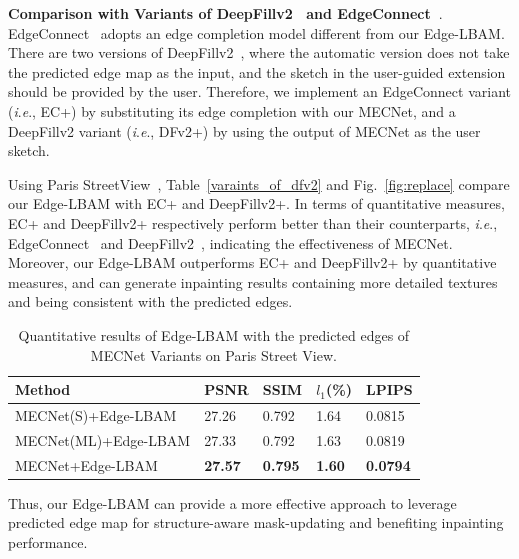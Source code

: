 \documentclass[10pt,journal,compsoc]{IEEEtran}
\newcommand{\ie}{\textit{i}.\textit{e}.}
\begin{document}
{\textbf{Comparison with Variants of DeepFillv2~\cite{yu2018free} and EdgeConnect~\cite{nazeri2019edgeconnect}}.}
%
EdgeConnect~\cite{nazeri2019edgeconnect} adopts an edge completion model different from our Edge-LBAM.
%
There are two versions of DeepFillv2~\cite{yu2018free}, where the automatic version does not take the predicted edge map as the input, and the sketch in the user-guided extension should be provided by the user.
%
Therefore, we implement an EdgeConnect variant (\ie, EC+) by substituting its edge completion with our MECNet, and a DeepFillv2 variant (\ie, DFv2+) by using the output of MECNet as the user sketch.
%
%
%

Using Paris StreetView~\cite{doersch2015makes}, Table~\ref{varaints_of_dfv2} and Fig.~\ref{fig:replace} compare our Edge-LBAM with EC+ and DeepFillv2+.
%
In terms of quantitative measures, EC+ and DeepFillv2+ respectively perform better than their counterparts, \ie, EdgeConnect~\cite{nazeri2019edgeconnect} and DeepFillv2~\cite{yu2018free}, indicating the effectiveness of MECNet.
%
Moreover, our Edge-LBAM outperforms EC+ and DeepFillv2+ by quantitative measures, and can generate inpainting results containing more detailed textures and being consistent with the predicted edges.
%
\begin{table}[!htbp]
	\scriptsize
	\begin{center}
		\caption{Quantitative results of Edge-LBAM with the predicted edges of MECNet Variants on Paris Street View.}
		\begin{tabular}{p{3.1cm}<{\centering} p{0.9cm}<{\centering} p{0.9cm}<{\centering} p{0.9cm}<{\centering} p{0.9cm}<{\centering}}%
			\toprule
			Method & PSNR &SSIM & $l_1$(\%) & LPIPS \\
			\midrule
			MECNet(S)+Edge-LBAM &27.26 & 0.792 & 1.64 & 0.0815 \\
			\midrule
			MECNet(ML)+Edge-LBAM &27.33 & 0.792 & 1.63 & 0.0819 \\
			\midrule
			MECNet+Edge-LBAM & \textbf{27.57} &\textbf{0.795} & \textbf{1.60} & \textbf{0.0794}\\
			\bottomrule
		\end{tabular}
		\label{mecnet_variants}
	\end{center}
\end{table}	
%
Thus, our Edge-LBAM can provide a more effective approach to leverage predicted edge map for structure-aware mask-updating and benefiting inpainting performance.
\end{document}
